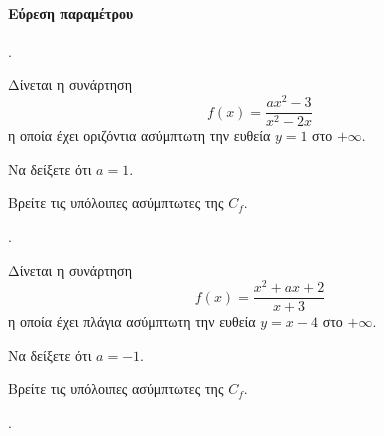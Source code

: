 \documentclass[11pt,a4paper,twocolumn]{article}
\newcounter{askhsh}
\newcommand{\askhsh}{\large\theaskhsh.\ \addtocounter{askhsh}{1}}
\begin{document}
\paragraph{Εύρεση παραμέτρου}
\askhsh Δίνεται η συνάρτηση \[f(x)=\dfrac{ax^2-3}{x^2-2x}\] η οποία έχει οριζόντια ασύμπτωτη την ευθεία $y=1$ στο $+\infty$.
\begin{alist}
\item Να δείξετε ότι $a=1$.
\item Βρείτε τις υπόλοιπες ασύμπτωτες της $C_f$.
\end{alist}
\askhsh Δίνεται η συνάρτηση \[f(x)=\dfrac{x^2+ax+2}{x+3}\] η οποία έχει πλάγια ασύμπτωτη την ευθεία $y=x-4$ στο $+\infty$.
\begin{alist}
\item Να δείξετε ότι $a=-1$.
\item Βρείτε τις υπόλοιπες ασύμπτωτες της $C_f$.
\end{alist}
\askhsh 
\end{document}
